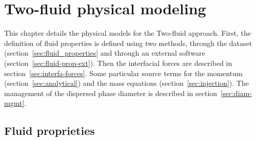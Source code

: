 \chapter{Two-fluid physical modeling\label{sec:phyical_modeling}}

This chapter details the physical models for the Two-fluid approach. First, the definition of fluid properties is defined using two methods, through the dataset (section~\ref{sec:fluid_properties} and through an external software (section~\ref{sec:fluid-prop-ext}). Then the interfacial forces are described in section~\ref{sec:interfa-forces}. Some particular source terms for the momentum (section~\ref{sec:analytical}) and the mass equations (section~\ref{sec:injection}). The management of the dispersed phase diameter is described in section~\ref{sec:diam-mgmt}.

\section{Fluid proprieties\label{sec:fluid_properties}}
